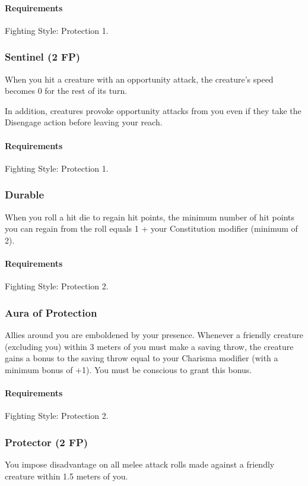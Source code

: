     \paragraph{Requirements} Fighting Style: Protection 1.
\subsubsection{Sentinel (2 FP)} \label{feat::sentinel}
    When you hit a creature with an opportunity attack, the creature's speed becomes 0 for the rest of its turn.

    In addition, creatures provoke opportunity attacks from you even if they take the Disengage action before leaving your reach.
    \paragraph{Requirements} Fighting Style: Protection 1.
\subsubsection{Durable} \label{feat::durable}
    When you roll a hit die to regain hit points, the minimum number of hit points you can regain from the roll equals 1 + your Constitution modifier (minimum of 2).
    \paragraph{Requirements} Fighting Style: Protection 2.
\subsubsection{Aura of Protection} \label{feat::auraofprotection}
    Allies around you are emboldened by your presence.
    Whenever a friendly creature (excluding you) within 3 meters of you must make a saving throw, the creature gains a bonus to the saving throw equal to your Charisma modifier (with a minimum bonus of +1).
    You must be conscious to grant this bonus.
    \paragraph{Requirements} Fighting Style: Protection 2.
\subsubsection{Protector (2 FP)} \label{feat::protector}
    You impose disadvantage on all melee attack rolls made against a friendly creature within 1.5 meters of you.
